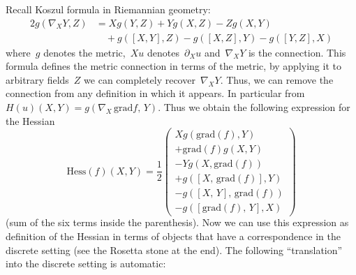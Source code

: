 Recall Koszul formula in Riemannian geometry:
\[
	\begin{array}{ll}
		2 g(\nabla_XY, Z) &=
		X g(Y,Z)
		+
		Y g(X,Z)
		-
		Z g(X,Y) \\
		&
		\quad + g([X,Y],Z) - g([X,Z],Y) - g([Y,Z],X)
	\end{array}
\]
where~$g$ denotes the metric,~$Xu$ denotes~$\partial_X u$ and~$\nabla_XY$ is
the connection.  This formula defines the metric connection in terms of the
metric, by applying it to arbitrary fields~$Z$ we can completely
recover~$\nabla_XY$.  Thus, we can remove the connection from any definition
in which it appears.  In particular from~$H(u)(X,Y)=g(\nabla_X\,\mathrm{grad}
f,\,Y)$.  Thus we obtain the following expression for the Hessian
\begin{equation*}
	\mathrm{Hess}\left(f\right)(X,Y) =
	\frac12\left(
		\begin{array}{l}
		X g\!\left(\mathrm{grad}\!\left(f\right),Y\right)\\
		+
		\mathrm{grad}\!\left(f\right) g\!\left(X,Y\right)\\
		-
		Y g\!\left(X,\mathrm{grad}\!\left(f\right)\right) \\
		+
		g\!\left(\left[X,\,\mathrm{grad}\!\left(f\right)\right],Y\right)\\
		-
		g\!\left(\left[X,\,Y\right],\,\mathrm{grad}\!\left(f\right)\right)\\
		-
		g\!\left(\left[\mathrm{grad}\!\left(f\right),\,Y\right],X\right)
		\end{array}
	\right)
\end{equation*}
(sum of the six terms inside the parenthesis).  Now we can use this
expression as definition of the Hessian in terms of objects that have a
correspondence in the discrete setting (see the Rosetta stone at the
end).  The following ``translation'' into the discrete setting is automatic:
